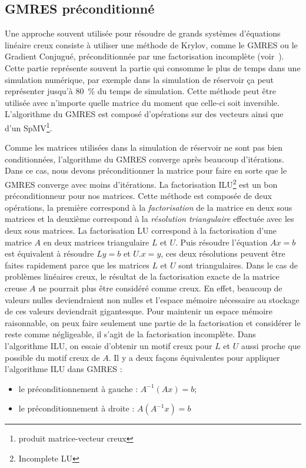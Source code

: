 \subsection{GMRES préconditionné}
Une approche souvent utilisée pour résoudre de grands systèmes d'équations linéaire creux consiste à utiliser une méthode de Krylov, comme le GMRES ou le Gradient Conjugué, préconditionnée par une factorisation incomplète (voir~\cite{Saad96IMSLS}).
%
Cette partie représente souvent la partie qui consomme le plus de temps dans une simulation numérique, par exemple dans la simulation de réservoir ça peut représenter jusqu'à 80~\% du temps de simulation.
%
Cette méthode peut être utilisée avec n'importe quelle matrice du moment que celle-ci soit inversible.
%
L'algorithme du GMRES est composé d'opérations sur des vecteurs ainsi que d'un SpMV\footnote{produit matrice-vecteur creux}.

Comme les matrices utilisées dans la simulation de réservoir ne sont pas bien conditionnées, l'algorithme du GMRES converge après beaucoup d'itérations.
%
Dans ce cas, nous devons préconditionner la matrice pour faire en sorte que le GMRES converge avec moins d'itérations.
%
La factorisation ILU\footnote{Incomplete LU} est un bon préconditionneur pour nos matrices.
%
Cette méthode est composée de deux opérations, la première correspond à la {\em factorisation} de la matrice en deux sous matrices et la deuxième correspond à la {\em résolution triangulaire} effectuée avec les deux sous matrices.
%
La factorisation LU correspond à la factorisation d'une matrice $A$ en deux matrices triangulaire $L$ et $U$.
%
Puis résoudre l'équation $Ax=b$ est équivalent à résoudre $Ly=b$ et $U.x=y$, ces deux résolutions peuvent être faites rapidement parce que les matrices $L$ et $U$ sont triangulaires.
%
Dans le cas de problèmes linéaires creux, le résultat de la factorisation exacte de la matrice creuse $A$ ne pourrait plus être considéré comme creux.
%
En effet, beaucoup de valeurs nulles deviendraient non nulles et l'espace mémoire nécessaire au stockage de ces valeurs deviendrait gigantesque.
%
Pour maintenir un espace mémoire raisonnable, on peux faire seulement une partie de la factorisation et considérer le reste comme négligeable, il s'agit de la factorisation incomplète.
%
Dans l'algorithme ILU, on essaie d'obtenir un motif creux pour $L$ et $U$ aussi proche que possible du motif creux de $A$.
%
Il y a deux façons équivalentes pour appliquer l'algorithme ILU dans GMRES :
\begin{itemize}
  \item le préconditionnement à gauche : $A^{-1}(Ax)=b$;
  \item le préconditionnement à droite : $A(A^{-1}x)=b$
\end{itemize}
%
